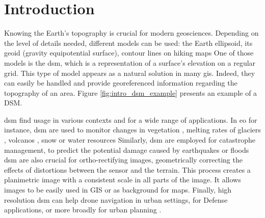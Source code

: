 \chapter*{Introduction}
Knowing the Earth's topography is crucial for modern geosciences. Depending on the level of details needed, different models can be used: the Earth ellipsoid, its geoid (gravity equipotential surface), contour lines on hiking maps \etc One of those models is the \acrfull{dsm}, which is a representation of a surface's elevation on a regular grid. This type of model appears as a natural solution in many \acrfull{gis}. Indeed, they can easily be handled and provide georeferenced information regarding the topography of an area. Figure \ref{fig:intro_dsm_example} presents an example of a DSM.

\acrshort{dsm} find usage in various contexts and for a wide range of applications. In \acrfull{eo} for instance, \acrshort{dsm} are used to monitor changes in vegetation \cite{sadeghi_canopy_2016}, melting rates of glaciers \cite{berthier_glacier_2014, rieg_pleiades_2018}, volcanos \cite{ganci_data_2022}, snow or water resources \cite{marti_mapping_2016, gascoin_theia_2019, yamazaki_merit_2019} \etc{} Similarly, \acrshort{dsm} are employed for catastrophe management, to predict the potential damage caused by earthquakes or floods \cite{jenkins_physics-based_2023} \etc{} \acrshort{dsm} are also crucial for ortho-rectifying images, \ie geometrically correcting the effects of distortions between the sensor and the terrain. This process creates a planimetric image with a consistent scale in all parts of the image. It allows images to be easily used in GIS or as background for maps. Finally, high resolution \acrshort{dsm} can help drone navigation in urban settings, for Defense applications, or more broadly for urban planning \cite{velazco_3d_2012}.

